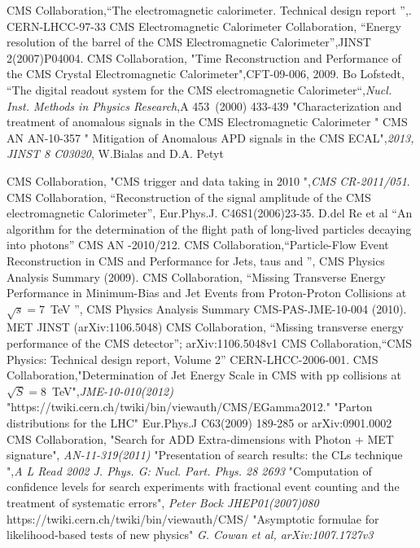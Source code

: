 \begin{thebibliography}{9}
CMS Collaboration,``The electromagnetic calorimeter. Technical design report '',. CERN-LHCC-97-33
CMS Electromagnetic Calorimeter Collaboration, ``Energy resolution of the barrel of the CMS Electromagnetic Calorimeter'',JINST 2(2007)P04004.
CMS Collaboration, "Time Reconstruction and Performance of the CMS Crystal Electromagnetic Calorimeter",CFT-09-006, 2009.
 Bo Lofstedt, ``The digital readout system for the CMS electromagnetic Calorimeter``,\textit{Nucl. Inst.  Methods in Physics Research},A 453~(2000) 433-439
 "Characterization and treatment of anomalous signals in the CMS Electromagnetic Calorimeter " CMS AN AN-10-357
 " Mitigation of Anomalous APD signals in the CMS ECAL",\textit{2013, JINST 8 C03020}, W.Bialas and D.A. Petyt

CMS Collaboration, "CMS trigger and data taking in 2010 ",\emph{CMS CR-2011/051}.
CMS Collaboration, ``Reconstruction of the signal amplitude of the CMS electromagnetic Calorimeter'', Eur.Phys.J. C46S1(2006)23-35.
 D.del Re et al ``An algorithm for the determination of the flight path of long-lived particles decaying into photons'' CMS AN -2010/212.
CMS Collaboration,``Particle-Flow Event Reconstruction in CMS and Performance for Jets, taus and \ETslash'', CMS Physics Analysis Summary (2009).
CMS Collaboration, “Missing Transverse Energy Performance in Minimum-Bias and Jet Events from Proton-Proton Collisions at $\sqrt{s} =7$~TeV ”, CMS Physics Analysis Summary CMS-PAS-JME-10-004 (2010).
MET JINST (arXiv:1106.5048)
CMS Collaboration, ``Missing transverse energy performance of the CMS detector''; arXiv:1106.5048v1
CMS Collaboration,``CMS Physics: Technical design report, Volume 2'' CERN-LHCC-2006-001.
 CMS Collaboration,"Determination of Jet Energy Scale in CMS with pp collisions at $\sqrt{S} = 8$~TeV",\textit{JME-10-010(2012)}
 "https://twiki.cern.ch/twiki/bin/viewauth/CMS/EGamma2012."
 "Parton distributions for the LHC" Eur.Phys.J C63(2009) 189-285 or arXiv:0901.0002
 CMS Collaboration, "Search for ADD Extra-dimensions with Photon + MET signature", \textit{AN-11-319(2011)}
 "Presentation of search results: the CLs technique ",\textit{A L Read 2002 J. Phys. G: Nucl. Part. Phys. 28 2693}
 "Computation of confidence levels for search experiments with fractional event counting and the treatment of systematic errors", \textit{Peter Bock JHEP01(2007)080}
 https://twiki.cern.ch/twiki/bin/viewauth/CMS/
  "Asymptotic formulae for likelihood-based tests of new physics" \textit{G. Cowan et al, arXiv:1007.1727v3}

\end{thebibliography}